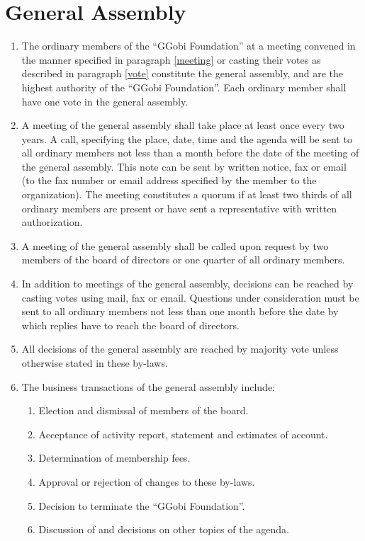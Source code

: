 \documentclass{article}
\begin{document}
\section{General Assembly}

\begin{enumerate} \itemsep 0in
\item The ordinary members of the ``GGobi Foundation'' at a meeting
convened in the manner specified in paragraph \ref{meeting} or casting
their votes as described in paragraph \ref{vote} constitute the
general assembly, and are the highest authority of the ``GGobi
Foundation''. Each ordinary member shall have one vote in the general
assembly.

\item A meeting of the general assembly shall take place at least 
once every two years. A call, specifying the place, date, time and the
agenda will be sent to all ordinary members not less than a month
before the date of the meeting of the general assembly. This note can
be sent by written notice, fax or email (to the fax number or email
address specified by the member to the organization). The meeting
constitutes a quorum if at least two thirds of all ordinary members
are present or have sent a representative with written
authorization.\label{meeting}

\item A meeting of the general assembly shall be called upon request 
by two members of the board of directors or one quarter of all
ordinary members.

\item In addition to meetings of the general assembly, decisions can be 
reached by casting votes using mail, fax or email. Questions under
consideration must be sent to all ordinary members not less than one
month before the date by which replies have to reach the board of
directors. \label{vote}

\item All decisions of the general assembly are reached by majority 
vote unless otherwise stated in these by-laws.

\item The business transactions of the general assembly include:
\begin{enumerate} \itemsep 0in
\item Election and dismissal of members of the board.
\item Acceptance of activity report, statement and estimates of account.
\item Determination of membership fees.
\item Approval or rejection of changes to these by-laws.
\item Decision to terminate the ``GGobi Foundation''.
\item Discussion of and decisions on other topics of the agenda.
\end{enumerate}
\end{enumerate}
\end{document}
